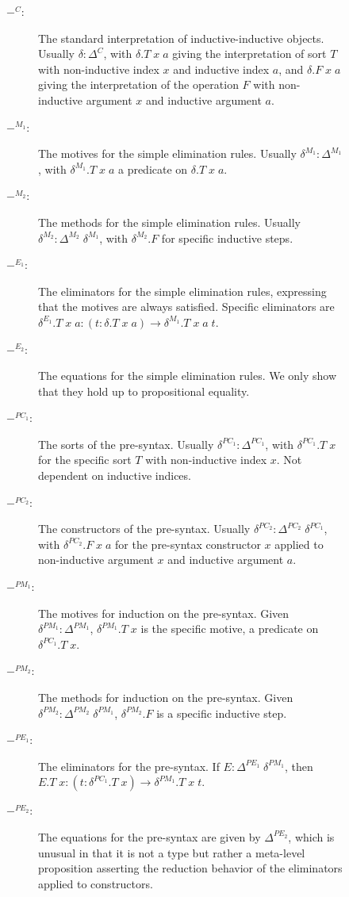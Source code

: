 \documentclass[runningheads]{llncs}
\begin{document}
{\begin{figure}[htpb]
    \begin{description}
        \item[$-^C$:] The standard interpretation of inductive-inductive objects. Usually $\delta : \Delta^C$, with $\delta.T\;x\;a$ giving the interpretation of sort $T$ with non-inductive index $x$ and inductive index $a$, and $\delta.F\;x\;a$ giving the interpretation of the operation $F$ with non-inductive argument $x$ and inductive argument $a$.
        \item[$-^{M_1}$:] The motives for the simple elimination rules. Usually $\delta^{M_1} : \Delta^{M_1}$, with $\delta^{M_1}.T\;x\;a$ a predicate on $\delta.T\;x\;a$.
        \item[$-^{M_2}$:] The methods for the simple elimination rules. Usually $\delta^{M_2} : \Delta^{M_2}\;\delta^{M_1}$, with $\delta^{M_2}.F$ for specific inductive steps.
        \item[$-^{E_1}$:] The eliminators for the simple elimination rules, expressing that the motives are always satisfied. Specific eliminators are $\delta^{E_1}.T\;x\;a : (t : \delta.T\;x\;a) \to \delta^{M_1}.T\;x\;a\;t$.
        \item[$-^{E_2}$:] The equations for the simple elimination rules. We only show that they hold up to propositional equality.
        \item[$-^{PC_1}$:] The sorts of the pre-syntax. Usually $\delta^{PC_1} : \Delta^{PC_1}$, with $\delta^{PC_1}.T\;x$ for the specific sort $T$ with non-inductive index $x$. Not dependent on inductive indices.
        \item[$-^{PC_2}$:] The constructors of the pre-syntax. Usually $\delta^{PC_2} : \Delta^{PC_2}\;\delta^{PC_1}$, with $\delta^{PC_2}.F\;x\;a$ for the pre-syntax constructor $x$ applied to non-inductive argument $x$ and inductive argument $a$.
        \item[$-^{PM_1}$:] The motives for induction on the pre-syntax. Given $\delta^{PM_1} : \Delta^{PM_1}$, $\delta^{PM_1}.T\;x$ is the specific motive, a predicate on $\delta^{PC_1}.T\;x$.
        \item[$-^{PM_2}$:] The methods for induction on the pre-syntax. Given $\delta^{PM_2} : \Delta^{PM_2}\;\delta^{PM_1}$, $\delta^{PM_2}.F$ is a specific inductive step.
        \item[$-^{PE_1}$:] The eliminators for the pre-syntax. If $E : \Delta^{PE_1}\;\delta^{PM_1}$, then $E.T\;x : (t : \delta^{PC_1}.T\;x) \to \delta^{PM_1}.T\;x\;t$.
        \item[$-^{PE_2}$:] The equations for the pre-syntax are given by $\Delta^{PE_2}$, which is unusual in that it is not a type but rather a meta-level proposition asserting the reduction behavior of the eliminators applied to constructors.

\end{description}
\end{figure}}
\end{document}
